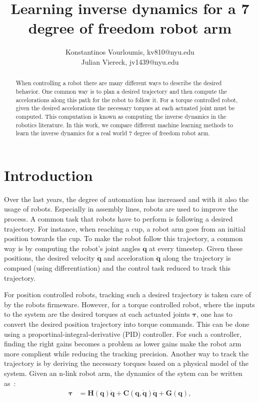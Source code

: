 \documentclass[letterpaper, 10 pt, conference]{ieeeconf}  %
\title{\LARGE \bf
Learning inverse dynamics for a 7 degree of freedom robot arm
}
\author{Konstantinos Vourloumis, kv810@nyu.edu\\ Julian Viereck, jv1439@nyu.edu}
\renewcommand{\b}[1]{\bm{#1}}
\begin{document}
\maketitle
\thispagestyle{empty}
\pagestyle{empty}


\begin{abstract}

When controlling a robot there are many different ways to describe the desired behavior. One common way is to plan a desired trajectory and then compute the accelorations along this path for the robot to follow it. For a torque controlled robot, given the desired accelorations the necessary torques at each actuated joint must be computed. This computation is known as computing the inverse dynamics in the robotics literature. In this work, we compare different machine learning methods to learn the inverse dynamics for a real world 7 degree of freedom robot arm.
\end{abstract}


\section{Introduction}

Over the last years, the degree of automation has increased and with it also the usage of robots. Especially in assembly lines, robots are used to improve the process. A common task that robots have to perform is following a desired trajectory. For instance, when reaching a cup, a robot arm goes from an initial position towards the cup. To make the robot follow this trajectory, a common way is by computing the robot's joint angles $\b{q}$ at every timestep. Given these positions, the desired velocity $\b{\dot{q}}$ and acceloration $\b{\ddot{q}}$ along the trajectory is compued (using differentiation) and the control task reduced to track this trajectory.

For position controlled robots, tracking such a desired trajectory is taken care of by the robots firmeware. However, for a torque controlled robot, where the inputs to the system are the desired torques at each actuated joints $\b{\tau}$, one has to convert the desired position trajectory into torque commands. This can be done using a proportinal-integral-derivative (PID) controller. For such a controller, finding the right gains becomes a problem as lower gains make the robot arm more complient while reducing the tracking precision. Another way to track the trajectory is by deriving the necessary torques based on a physical model of the system. Given an n-link robot arm, the dynamics of the sytem can be written as~\cite{murray2017mathematical}:
~
\begin{align}
\label{eq:dyn_tau}
\b{\tau} &= \b{H}(\b{q})\b{\ddot{q}} + \b{C}(\b{q}, \dot{\b{q}})\dot{\b{q}} + \b{G}(\b{q}),
\end{align}
\end{document}
